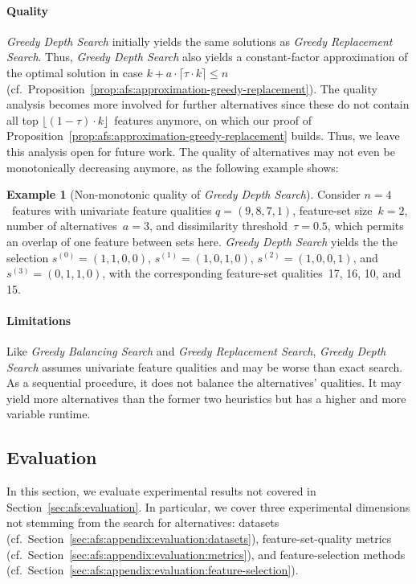 \documentclass{article}
\theoremstyle{definition}
\newtheorem{example}{Example}
\begin{document}
\paragraph{Quality}

\emph{Greedy Depth Search} initially yields the same solutions as \emph{Greedy Replacement Search}.
Thus, \emph{Greedy Depth Search} also yields a constant-factor approximation of the optimal solution in case $k + a \cdot \lceil \tau \cdot k \rceil \leq n$ (cf.~Proposition~\ref{prop:afs:approximation-greedy-replacement}).
The quality analysis becomes more involved for further alternatives since these do not contain all top $\lfloor (1 - \tau) \cdot k \rfloor$~features anymore, on which our proof of Proposition~\ref{prop:afs:approximation-greedy-replacement} builds.
Thus, we leave this analysis open for future work.
The quality of alternatives may not even be monotonically decreasing anymore, as the following example shows:
%
\begin{example}[Non-monotonic quality of \emph{Greedy Depth Search}]
	Consider $n=4$~features with univariate feature qualities $q = (9,8,7,1)$, feature-set size~$k=2$, number of alternatives~$a=3$, and dissimilarity threshold~$\tau = 0.5$, which permits an overlap of one feature between sets here.
	\emph{Greedy Depth Search} yields the the selection $s^{(0)} = (1,1,0,0)$, $s^{(1)} = (1,0,1,0)$, $s^{(2)} = (1,0,0,1)$, and $s^{(3)} = (0,1,1,0)$, with the corresponding feature-set qualities~17, 16, 10, and 15.
	\label{ex:afs:greedy-depth:non-monotonic}
\end{example}

\paragraph{Limitations}

Like \emph{Greedy Balancing Search} and \emph{Greedy Replacement Search}, \emph{Greedy Depth Search} assumes univariate feature qualities and may be worse than exact search.
As a sequential procedure, it does not balance the alternatives' qualities.
It may yield more alternatives than the former two heuristics but has a higher and more variable runtime.

\subsection{Evaluation}
\label{sec:afs:appendix:evaluation}

In this section, we evaluate experimental results not covered in Section~\ref{sec:afs:evaluation}.
In particular, we cover three experimental dimensions not stemming from the search for alternatives:
datasets (cf.~Section~\ref{sec:afs:appendix:evaluation:datasets}), feature-set-quality metrics (cf.~Section~\ref{sec:afs:appendix:evaluation:metrics}), and feature-selection methods (cf.~Section~\ref{sec:afs:appendix:evaluation:feature-selection}).
\end{document}

